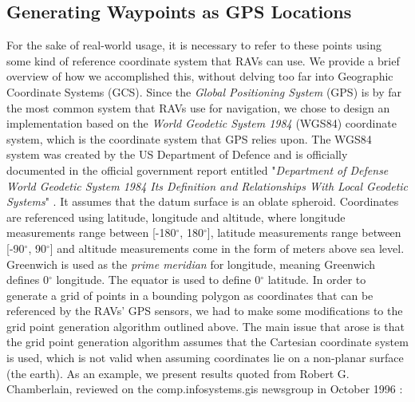 





\subsection{Generating Waypoints as GPS Locations}
For the sake of real-world usage, it is necessary to refer to these points using some kind of reference coordinate system that RAVs can use. We provide a brief overview of how we accomplished this, without delving too far into Geographic Coordinate Systems (GCS). Since the \textit{Global Positioning System} (GPS) is by far the most common system that RAVs use for navigation, we chose to design an implementation based on the \textit{World Geodetic System 1984} (WGS84) coordinate system, which is the coordinate system that GPS relies upon. The WGS84 system was created by the US Department of Defence and is officially documented in the official government report entitled "\textit{Department of Defense World Geodetic System 1984 Its Definition and Relationships With Local Geodetic Systems}" \cite{ReportpreparedbytheDMAWGS84DevelopmentCommittee1991Department1984}. It assumes that the datum surface is an oblate spheroid.
Coordinates are referenced using latitude, longitude and altitude, where longitude measurements range between [-180$^{\circ}$, 180$^{\circ}$], latitude measurements range between [-90$^{\circ}$, 90$^{\circ}$] and altitude measurements come in the form of meters above sea level. Greenwich is used as the \textit{prime meridian} for longitude, meaning Greenwich defines 0$^{\circ}$ longitude. The equator is used to define 0$^{\circ}$ latitude. In order to generate a grid of points in a bounding polygon as coordinates that can be referenced by the RAVs' GPS sensors, we had to make some modifications to the grid point generation algorithm outlined above. The main issue that arose is that the grid point generation algorithm assumes that the Cartesian coordinate system is used, which is not valid when assuming coordinates lie on a  non-planar surface (the earth). As an example, we present results quoted from Robert G. Chamberlain, reviewed on the comp.infosystems.gis newsgroup in October 1996 \cite{GISL_LISTSERVER}:

